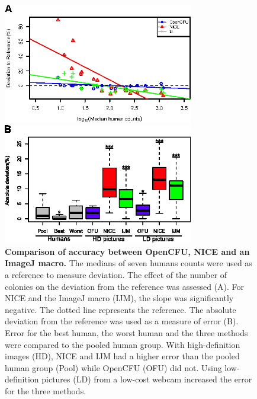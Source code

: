 \documentclass[10pt]{article}
\newcommand{\n}{seven}
\newcommand{\IJM}{IJM}
\begin{document}
\begin{figure}[!ht]
\begin{center}
\includegraphics[width=3.27in]{./fig4A.eps}

\includegraphics[width=3.27in]{./fig4B.eps}

\end{center}

\caption{{\bf Comparison of accuracy between OpenCFU, NICE\cite{clarke_lowcost_2010} and  an ImageJ macro\cite{cai_optimized_2011}.} 
The medians of \n{} humans counts were used as a reference to measure deviation. The effect of
the number of colonies on the deviation from the reference was assessed (A). For NICE and the ImageJ macro (\IJM), the
slope was significantly negative. The dotted line represents the reference.
The absolute deviation from the reference was used as a measure of error (B). Error
for the best human, the worst human and the three methods were compared to the
pooled human group. With high-definition images (HD), NICE and \IJM{} had a higher error than the pooled human
group (Pool) while OpenCFU (OFU) did not. Using low-definition pictures (LD) from a low-cost webcam increased the error for the three methods.}
\label{figAccu}
\end{figure}


\newpage{}
\end{document}
